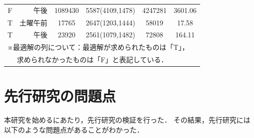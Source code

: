 \documentclass[12pt, a4paper, fleqn]{jreport}
\begin{document}
\begin{table}[H]
\begin{center}
\begin{tabular}{cr|cccc}
F&午後           &1089430 & 5587(4109,1478) & 4247281 & 3601.06\\
T&土曜午前       &  17765 & 2647(1203,1444) & 58019   & 17.58  \\
T&午後           &  23920 & 2561(1079,1482) & 72808   & 164.11 \\
\hline
\multicolumn{6}{l}{※最適解の列について：最適解が求められたものは「T」，}\\
\multicolumn{6}{l}{ 　\hspace{39mm} 求められなかったものは「F」と表記している．}\\
 \end{tabular}
\end{center}
\end{table}


\newpage
\chapter{先行研究の問題点}
\label{mondaiten}
本研究を始めるにあたり，先行研究の検証を行った．
その結果，先行研究には以下のような問題点があることがわかった．
\end{document}
